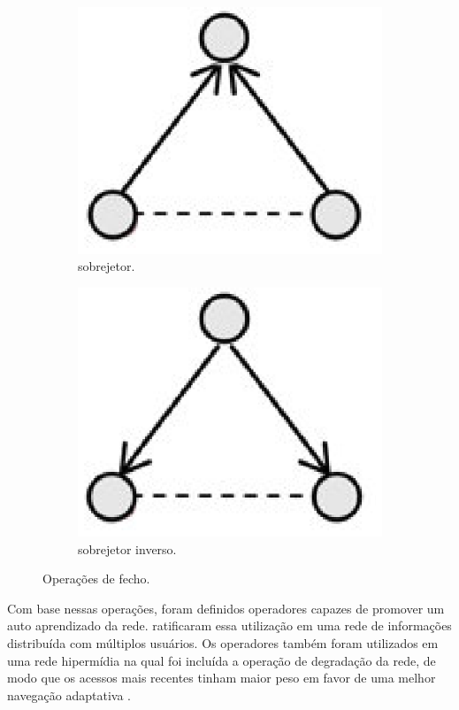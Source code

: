 \begin{figure}
\begin{subfigure}{.25\textwidth}
  		\includegraphics[width=.9\linewidth]{figuras/opfecho_c.eps}
  		\caption{sobrejetor.}
  		\label{fig:subop3}
	\end{subfigure}%
		\begin{subfigure}{.25\textwidth}
  		\centering
  		\includegraphics[width=.9\linewidth]{figuras/opfecho_d.eps}
  		\caption{sobrejetor inverso.}
  		\label{fig:subop4}
	\end{subfigure}
	\caption{Operações de fecho.}
	\label{fig:opfecho}
\end{figure}

Com base nessas operações, foram definidos operadores capazes de promover um auto aprendizado da rede.  ratificaram essa utilização em uma rede de informações distribuída com múltiplos usuários. Os operadores também foram utilizados em uma rede hipermídia na qual foi incluída a operação de degradação da rede, de modo que os acessos mais recentes tinham maior peso em favor de uma melhor navegação adaptativa \cite{palazzo2000}.

